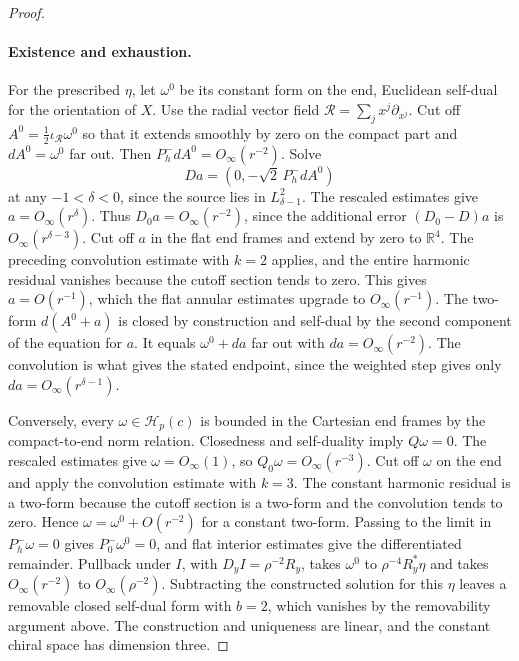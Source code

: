 \documentclass[11pt,letterpaper]{article}
\numberwithin{equation}{section}
\begin{document}
\begin{proof}
\paragraph{Existence and exhaustion.}
For the prescribed \(\eta\), let \(\omega^0\) be its constant form
on the end, Euclidean self-dual for the orientation of \(X\).
Use the radial vector field \(\mathcal R=\sum_j x^j\partial_{x^j}\).
Cut off \(A^0=\tfrac12\iota_{\mathcal R}\omega^0\) so that it extends
smoothly by zero on the compact part and \(dA^0=\omega^0\) far out.
Then \(P_h^-dA^0=O_\infty(r^{-2})\). Solve
\[
 Da=(0,-\sqrt{2}\,P_h^-dA^0)
\]
at any \(-1<\delta<0\), since the source lies in
\(L^2_{\delta-1}\). The rescaled estimates give
\(a=O_\infty(r^\delta)\). Thus \(D_0a=O_\infty(r^{-2})\), since
the additional error \((D_0-D)a\) is \(O_\infty(r^{\delta-3})\).
Cut off \(a\) in the flat end frames and extend by zero to
\(\mathbb R^4\). The preceding convolution estimate with \(k=2\)
applies, and the entire harmonic residual vanishes because the cutoff
section tends to zero. This gives \(a=O(r^{-1})\), which the flat annular estimates
upgrade to \(O_\infty(r^{-1})\). The two-form \(d(A^0+a)\) is closed by
construction and self-dual by the second component of the equation
for \(a\). It equals \(\omega^0+da\) far out with
\(da=O_\infty(r^{-2})\). The convolution is what gives the stated
endpoint, since the weighted step gives only
\(da=O_\infty(r^{\delta-1})\).

Conversely, every \(\omega\in\mathcal H_p(c)\) is bounded in the
Cartesian end frames by the compact-to-end norm relation. Closedness
and self-duality imply \(Q\omega=0\). The rescaled estimates give
\(\omega=O_\infty(1)\), so \(Q_0\omega=O_\infty(r^{-3})\).
Cut off \(\omega\) on the end and apply the convolution estimate
with \(k=3\). The constant harmonic residual is a two-form because
the cutoff section is a two-form and the convolution tends to zero.
Hence \(\omega=\omega^0+O(r^{-2})\) for a constant two-form.
Passing to the limit in \(P_h^-\omega=0\) gives
\(P_0^-\omega^0=0\), and flat interior estimates give the differentiated
remainder. Pullback under \(I\), with \(D_yI=\rho^{-2}R_y\),
takes \(\omega^0\) to \(\rho^{-4}R_y^*\eta\) and takes
\(O_\infty(r^{-2})\) to \(O_\infty(\rho^{-2})\).
Subtracting the constructed solution for this \(\eta\) leaves a
removable closed self-dual form with \(b=2\), which vanishes by the
removability argument above. The construction and uniqueness are linear,
and the constant chiral space has dimension three.
\end{proof}
\end{document}
